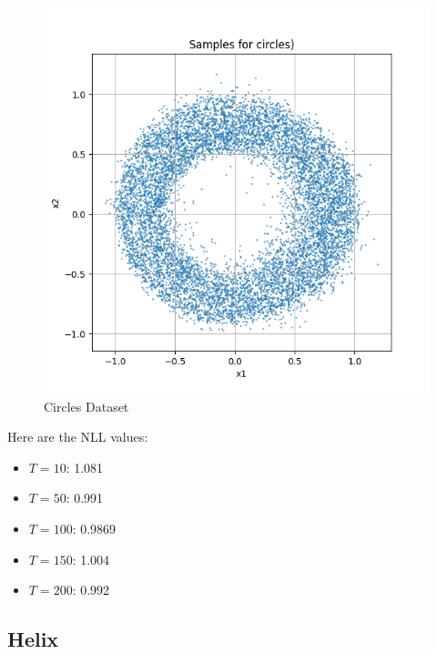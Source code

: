 \documentclass[a4paper,12pt]{article}
\begin{document}
\begin{figure}[h]
\begin{minipage}{0.3\textwidth}
  \end{minipage}
  \begin{minipage}{0.3\textwidth}
      \centering
      \includegraphics[width=\linewidth]{"images/Samples for ddpm_2_200_0.0001_0.02_circles.png"}
  \end{minipage}

  \caption{Circles Dataset}
\end{figure}


Here are the NLL values:
\begin{itemize}
  \item $T = 10$: 1.081
  \item $T = 50$: 0.991
  \item $T = 100$: 0.9869
  \item $T = 150$: 1.004
  \item $T = 200$: 0.992
\end{itemize}


\clearpage

\subsection*{Helix}
\end{document}
